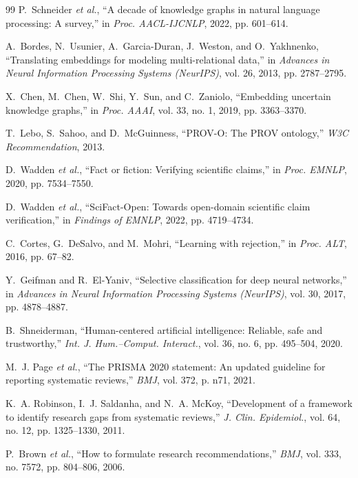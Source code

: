 \documentclass[conference,10pt]{IEEEtran}
\begin{document}
\begin{thebibliography}{99}
P.~Schneider \emph{et al.}, ``A decade of knowledge graphs in natural language processing: A survey,'' in \emph{Proc. AACL-IJCNLP}, 2022, pp. 601--614.

A.~Bordes, N.~Usunier, A.~Garcia-Duran, J.~Weston, and O.~Yakhnenko, ``Translating embeddings for modeling multi-relational data,'' in \emph{Advances in Neural Information Processing Systems (NeurIPS)}, vol. 26, 2013, pp. 2787--2795.

X.~Chen, M.~Chen, W.~Shi, Y.~Sun, and C.~Zaniolo, ``Embedding uncertain knowledge graphs,'' in \emph{Proc. AAAI}, vol. 33, no. 1, 2019, pp. 3363--3370.

T.~Lebo, S.~Sahoo, and D.~McGuinness, ``PROV-O: The PROV ontology,'' \emph{W3C Recommendation}, 2013.

D.~Wadden \emph{et al.}, ``Fact or fiction: Verifying scientific claims,'' in \emph{Proc. EMNLP}, 2020, pp. 7534--7550.

D.~Wadden \emph{et al.}, ``SciFact-Open: Towards open-domain scientific claim verification,'' in \emph{Findings of EMNLP}, 2022, pp. 4719--4734.

C.~Cortes, G.~DeSalvo, and M.~Mohri, ``Learning with rejection,'' in \emph{Proc. ALT}, 2016, pp. 67--82.

Y.~Geifman and R.~El-Yaniv, ``Selective classification for deep neural networks,'' in \emph{Advances in Neural Information Processing Systems (NeurIPS)}, vol. 30, 2017, pp. 4878--4887.

B.~Shneiderman, ``Human-centered artificial intelligence: Reliable, safe and trustworthy,'' \emph{Int. J. Hum.--Comput. Interact.}, vol. 36, no. 6, pp. 495--504, 2020.

M.~J. Page \emph{et al.}, ``The PRISMA 2020 statement: An updated guideline for reporting systematic reviews,'' \emph{BMJ}, vol. 372, p. n71, 2021.

K.~A. Robinson, I.~J. Saldanha, and N.~A. McKoy, ``Development of a framework to identify research gaps from systematic reviews,'' \emph{J. Clin. Epidemiol.}, vol. 64, no. 12, pp. 1325--1330, 2011.

P.~Brown \emph{et al.}, ``How to formulate research recommendations,'' \emph{BMJ}, vol. 333, no. 7572, pp. 804--806, 2006.


\end{thebibliography}
\end{document}
